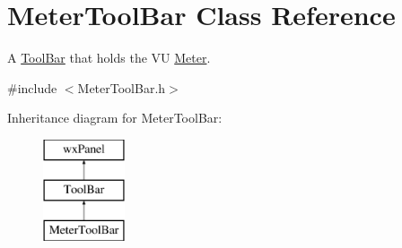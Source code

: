 \hypertarget{class_meter_tool_bar}{}\section{Meter\+Tool\+Bar Class Reference}
\label{class_meter_tool_bar}


A \hyperlink{class_tool_bar}{Tool\+Bar} that holds the VU \hyperlink{class_meter}{Meter}.  




{\ttfamily \#include $<$Meter\+Tool\+Bar.\+h$>$}

Inheritance diagram for Meter\+Tool\+Bar\+:\begin{figure}[H]
\begin{center}
\leavevmode
\includegraphics[height=3.000000cm]{class_meter_tool_bar}
\end{center}
\end{figure}
